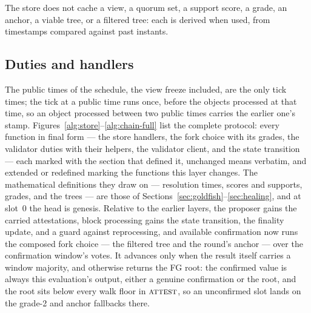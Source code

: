 \documentclass{article}
\theoremstyle{plain}
\theoremstyle{definition}
\theoremstyle{remark}
\begin{document}
The store does not cache a view, a quorum set, a support score, a grade,
an anchor, a viable tree, or a filtered tree: each is
derived when used, from timestamps compared against past instants.

\subsection{Duties and handlers}\label{sec:public-handlers}

The public times of the schedule, the view freeze included, are the
only tick times; the tick at a public time runs once, before the
objects processed at that time, so an object processed between two
public times carries the earlier one's stamp.
Figures~\ref{alg:store}--\ref{alg:chain-full} list the complete
protocol: every function in final form --- the store handlers, the
fork choice with its grades, the validator duties with their helpers,
the validator client, and the state transition --- each marked with the
section that defined it, unchanged means verbatim, and extended or
redefined marking the functions this layer changes.  The mathematical definitions they draw on --- resolution
times, scores and supports, grades, and the trees --- are those of
Sections~\ref{sec:goldfish}--\ref{sec:healing}, and at slot~$0$ the
head is genesis.  Relative to
the earlier layers, the proposer gains the carried attestations, block
processing gains the state transition, the finality update, and a
guard against reprocessing, and available confirmation now runs the
composed fork choice --- the filtered tree and the round's anchor ---
over the confirmation window's votes.  It advances only when the
result itself carries a window majority, and otherwise returns the
FG root: the confirmed value is always this evaluation's
output, either a genuine confirmation or the root, and the root sits
below every walk floor in $\Call{attest}{}$, so an unconfirmed slot
lands on the grade-2 and anchor fallbacks there.
\end{document}
